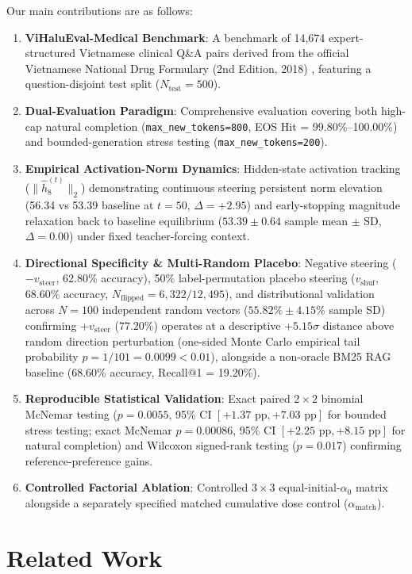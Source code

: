 Our main contributions are as follows:
\begin{enumerate}
    \item \textbf{ViHaluEval-Medical Benchmark}: A benchmark of 14,674 expert-structured Vietnamese clinical Q\&A pairs derived from the official Vietnamese National Drug Formulary (2nd Edition, 2018) \cite{ref6}, featuring a question-disjoint test split ($N_{\text{test}}=500$).
    \item \textbf{Dual-Evaluation Paradigm}: Comprehensive evaluation covering both high-cap natural completion (\texttt{max\_new\_tokens=800}, EOS Hit = 99.80\%--100.00\%) and bounded-generation stress testing (\texttt{max\_new\_tokens=200}).
    \item \textbf{Empirical Activation-Norm Dynamics}: Hidden-state activation tracking ($\|\hat{h}_8^{(t)}\|_2$) demonstrating continuous steering persistent norm elevation (56.34 vs 53.39 baseline at $t=50$, $\Delta = +2.95$) and early-stopping magnitude relaxation back to baseline equilibrium ($53.39 \pm 0.64$ sample mean $\pm$ SD, $\Delta = 0.00$) under fixed teacher-forcing context.
    \item \textbf{Directional Specificity \& Multi-Random Placebo}: Negative steering ($-v_{\text{steer}}$, 62.80\% accuracy), 50\% label-permutation placebo steering ($v_{\text{shuf}}$, 68.60\% accuracy, $N_{\text{flipped}}=6,322/12,495$), and distributional validation across $N=100$ independent random vectors ($55.82\% \pm 4.15\%$ sample SD) confirming $+v_{\text{steer}}$ ($77.20\%$) operates at a descriptive $+5.15\sigma$ distance above random direction perturbation (one-sided Monte Carlo empirical tail probability $p=1/101=0.0099 < 0.01$), alongside a non-oracle BM25 RAG baseline (68.60\% accuracy, Recall@1 = 19.20\%).
    \item \textbf{Reproducible Statistical Validation}: Exact paired $2\times 2$ binomial McNemar testing ($p=0.0055$, 95\% CI $[+1.37\text{ pp}, +7.03\text{ pp}]$ for bounded stress testing; exact McNemar $p=0.00086$, 95\% CI $[+2.25\text{ pp}, +8.15\text{ pp}]$ for natural completion) and Wilcoxon signed-rank testing ($p=0.017$) confirming reference-preference gains.
    \item \textbf{Controlled Factorial Ablation}: Controlled $3\times 3$ equal-initial-$\alpha_0$ matrix alongside a separately specified matched cumulative dose control ($\alpha_{\text{match}}$).
\end{enumerate}

\section{Related Work}

